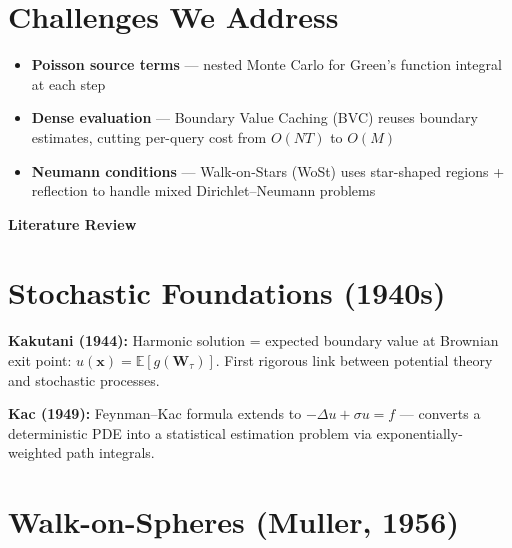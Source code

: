 \documentclass[11pt]{article}
\begin{document}
\section{Challenges We Address}

\begin{itemize}
  \item \textbf{Poisson source terms} --- nested Monte Carlo for Green's function integral at each step
  \item \textbf{Dense evaluation} --- Boundary Value Caching (BVC) reuses boundary estimates, cutting per-query cost from $O(NT)$ to $O(M)$
  \item \textbf{Neumann conditions} --- Walk-on-Stars (WoSt) uses star-shaped regions + reflection to handle mixed Dirichlet--Neumann problems
\end{itemize}

\newpage

\begin{center}
  {\LARGE\bfseries\color{accent} Literature Review}
\end{center}

\vspace{8pt}

\section{Stochastic Foundations (1940s)}

\begin{tcolorbox}[colback=lightbg,colframe=accent,boxrule=0.5pt,arc=2pt,left=6pt,right=6pt,top=4pt,bottom=4pt]
\textbf{Kakutani (1944):} Harmonic solution = expected boundary value at Brownian exit point: $u(\mathbf{x}) = \mathbb{E}[g(\mathbf{W}_\tau)]$. First rigorous link between potential theory and stochastic processes.

\textbf{Kac (1949):} Feynman--Kac formula extends to $-\Delta u + \sigma u = f$ --- converts a deterministic PDE into a statistical estimation problem via exponentially-weighted path integrals.
\end{tcolorbox}

\section{Walk-on-Spheres (Muller, 1956)}
\end{document}
